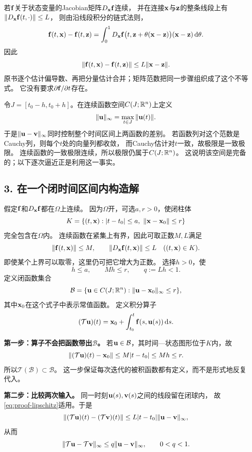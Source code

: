 若$\vect{f}$关于状态变量的Jacobian矩阵$D_{\vect{x}}\vect{f}$连续，
并在连接$\vect{x}$与$\vect{z}$的整条线段上有$\|D_{\vect{x}}\vect{f}(t,\cdot)\|\le L$，
则由沿线段积分的链式法则，
\[
 \vect{f}(t,\vect{x})-\vect{f}(t,\vect{z})
 =\int_0^1D_{\vect{x}}\vect{f}\bigl(t,\vect{z}+\theta(\vect{x}-\vect{z})\bigr)(\vect{x}-\vect{z})\,\dd\theta.
\]
因此
\begin{equation}
 \|\vect{f}(t,\vect{x})-\vect{f}(t,\vect{z})\|\le L\|\vect{x}-\vect{z}\|.
 \label{eq:proof-lipschitz}
\end{equation}
原书逐个估计偏导数、再把分量估计合并；矩阵范数把同一步骤组织成了这个不等式。
它没有要求$\partial \vect{f}/\partial t$存在。

令$J=[t_0-h,t_0+h]$。在连续函数空间$C(J;\mathbb R^n)$上定义
\[
 \|\vect{u}\|_\infty=\max_{t\in J}\|\vect{u}(t)\|.
\]
于是$\|\vect{u}-\vect{v}\|_\infty$同时控制整个时间区间上两函数的差别。
若函数列对这个范数是Cauchy列，则每个$t$处的向量列都收敛，
而Cauchy估计对$t$一致，故极限是一致极限。
连续函数的一致极限连续，所以极限仍属于$C(J;\mathbb R^n)$。
这说明该空间是完备的；以下逐次逼近正是利用这一事实。

\subsection*{3. 在一个闭时间区间内构造解}

假定$\vect{f}$和$D_{\vect{x}}\vect{f}$都在$\Omega$上连续。
因为$\Omega$开，可选$a,r>0$，使闭柱体
\[
 K=\{(t,\vect{x}):|t-t_0|\le a,\ \|\vect{x}-\vect{x}_0\|\le r\}
\]
完全包含在$\Omega$内。
连续函数在紧集上有界，因此可取正数$M,L$满足
\[
 \|\vect{f}(t,\vect{x})\|\le M,\qquad \|D_{\vect{x}}\vect{f}(t,\vect{x})\|\le L
 \quad ((t,\vect{x})\in K).
\]
即使某个上界可以取零，这里仍可把它增大为正数。
选择$h>0$，使
\[
 h\le a,\qquad Mh\le r,\qquad q:=Lh<1.
\]
定义闭函数集合
\[
 \mathcal B=\{\vect{u}\in C(J;\R^n):\|\vect{u}-\vect{x}_0\|_\infty\le r\},
\]
其中$\vect{x}_0$在这个式子中表示常值函数。
定义积分算子
\[
 (\mathcal T\vect{u})(t)=\vect{x}_0+\int_{t_0}^t \vect{f}(s,\vect{u}(s))\,\dd s.
\]

\textbf{第一步：算子不会把函数带出$\mathcal B$。}
若$\vect{u}\in\mathcal B$，其时间—状态图形位于$K$内，故
\[
 \|(\mathcal T\vect{u})(t)-\vect{x}_0\|
 \le M|t-t_0|\le Mh\le r.
\]
所以$\mathcal T(\mathcal B)\subset\mathcal B$。
这一步保证每次迭代的被积函数都有定义，而不是形式地反复代入。

\textbf{第二步：比较两次输入。}
同一时刻$\vect{u}(s),\vect{v}(s)$之间的线段留在闭球内，
故\eqref{eq:proof-lipschitz}适用。于是
\[
 \|(\mathcal T\vect{u})(t)-(\mathcal T\vect{v})(t)\|
 \le L|t-t_0|\|\vect{u}-\vect{v}\|_\infty,
\]
从而
\begin{equation}
 \|\mathcal T\vect{u}-\mathcal T\vect{v}\|_\infty\le q\|\vect{u}-\vect{v}\|_\infty,
 \qquad 0<q<1.
 \label{eq:proof-contraction}
\end{equation}


